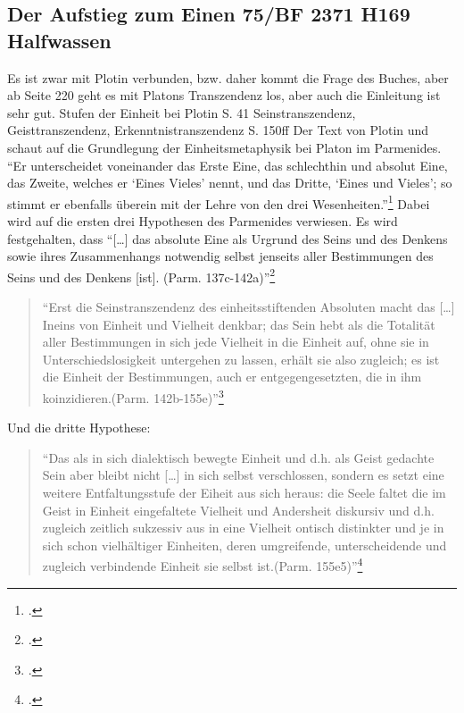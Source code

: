 \documentclass[12pt]{article}
\newcommand*{\zitatblock}[1]{%
    \begin{quote}
    \fontsize{10}{12}\selectfont
    \setlength{\parskip}{1.0em}
    #1
    \end{quote}
}
\begin{document}
\subsection*{Der Aufstieg zum Einen 75/BF 2371 H169 Halfwassen}
Es ist zwar mit Plotin verbunden, bzw. daher kommt die Frage des Buches, aber ab Seite 220 geht es mit Platons Transzendenz los, aber auch die Einleitung ist sehr gut.
Stufen der Einheit bei Plotin S. 41
Seinstranszendenz, Geisttranszendenz, Erkenntnistranszendenz S. 150ff
Der Text von Plotin und schaut auf die Grundlegung der Einheitsmetaphysik bei Platon im Parmenides. 
\enquote{Er unterscheidet voneinander das Erste Eine, das schlechthin und absolut Eine, das Zweite, welches er \enquote{Eines Vieles} nennt, und das Dritte, \enquote{Eines und Vieles}; so stimmt er ebenfalls überein mit der Lehre von den drei Wesenheiten.}\footcite[][S. 187f.]{halfwassenaufstieg2006}
Dabei wird auf die ersten drei Hypothesen des Parmenides verwiesen. Es wird festgehalten, dass \enquote{[\dots] das absolute Eine als Urgrund des Seins und des Denkens sowie ihres Zusammenhangs notwendig selbst jenseits aller Bestimmungen des Seins und des Denkens [ist]. (Parm. 137c-142a)}\footcite[vgl.][S. 188f.]{halfwassenaufstieg2006}
\zitatblock{\enquote{Erst die Seinstranszendenz des einheitsstiftenden Absoluten macht das [\dots] Ineins von Einheit und Vielheit denkbar; das Sein hebt als die Totalität aller Bestimmungen in sich jede Vielheit in die Einheit auf, ohne sie in Unterschiedslosigkeit untergehen zu lassen, erhält sie also zugleich; es ist die Einheit der Bestimmungen, auch er entgegengesetzten, die in ihm koinzidieren.(Parm. 142b-155e)}\footcite[vgl.][S. 189]{halfwassenaufstieg2006}}
Und die dritte Hypothese:
\zitatblock{\enquote{Das als in sich dialektisch bewegte Einheit und d.h. als Geist gedachte Sein aber bleibt nicht [\dots] in sich selbst verschlossen, sondern es setzt eine weitere Entfaltungsstufe der Eiheit aus sich heraus: die Seele faltet die im Geist in Einheit eingefaltete Vielheit und Andersheit diskursiv und d.h. zugleich zeitlich sukzessiv aus in eine Vielheit ontisch distinkter und je in sich schon vielhältiger Einheiten, deren umgreifende, unterscheidende und zugleich verbindende Einheit sie selbst ist.(Parm. 155e5)}\footcite[][S. 189]{halfwassenaufstieg2006}}
\end{document}
